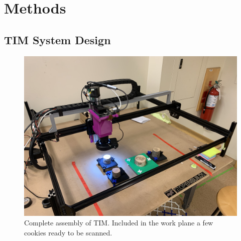 \documentclass[a4paper,12pt]{article}
\begin{document}
\section{Methods}

\subsection{TIM System Design} %

\begin{figure}
  \centering
  \includegraphics[height=0.5\linewidth]{../content/tina.jpg}
  \caption{Complete assembly of TIM. Included in the work plane a few cookies ready to be scanned.}
  \label{fig:tim_assembled}
\end{figure}
\end{document}
